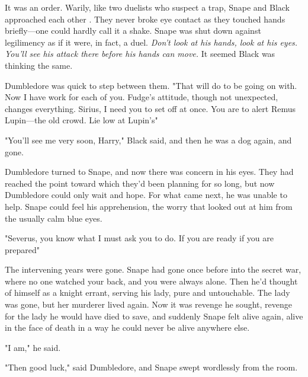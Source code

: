 It was an order. Warily, like two duelists who suspect a trap, Snape and Black approached each other . They never broke eye contact as they touched hands briefly—one could hardly call it a shake. Snape was shut down against legilimency as if it were, in fact, a duel. \emph{Don't look at his hands, look at his eyes. You'll see his attack there before his hands can move.} It seemed Black was thinking the same.

Dumbledore was quick to step between them. "That will do to be going on with. Now I have work for each of you. Fudge's attitude, though not unexpected, changes everything. Sirius, I need you to set off at once. You are to alert Remus Lupin{\el}—the old crowd. Lie low at Lupin's{\el}"

"You'll see me very soon, Harry," Black said, and then he was a dog again, and gone.

Dumbledore turned to Snape, and now there was concern in his eyes. They had reached the point toward which they'd been planning for so long, but now Dumbledore could only wait and hope. For what came next, he was unable to help. Snape could feel his apprehension, the worry that looked out at him from the usually calm blue eyes.

"Severus, you know what I must ask you to do. If you are ready{\el} if you are prepared{\el}"

The intervening years were gone. Snape had gone once before into the secret war, where no one watched your back, and you were always alone. Then he'd thought of himself as a knight errant, serving his lady, pure and untouchable. The lady was gone, but her murderer lived again. Now it was revenge he sought, revenge for the lady he would have died to save, and suddenly Snape felt alive again, alive in the face of death in a way he could never be alive anywhere else.

"I am," he said.

"Then good luck," said Dumbledore, and Snape swept wordlessly from the room.


